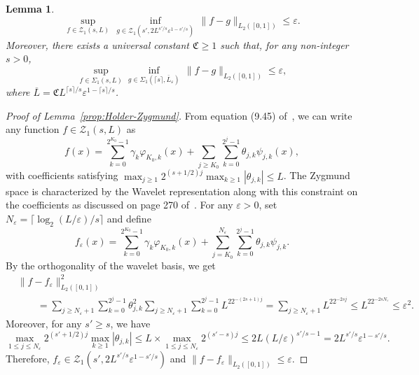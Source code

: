\documentclass[12pt]{article}
\newtheorem{lemma}[theorem]{Lemma}
\begin{document}
\begin{appendices}
\begin{lemma}
\[
\sup_{f\in\mathcal{Z}_1( s, L)}\,\inf_{g\in\mathcal{Z}_1( s', 2L^{ s'/ s}\varepsilon^{1- s'/ s})}\, \|f - g\|_{L_2([0, 1])} \le \varepsilon.
\]
Moreover, there exists a universal constant $\mathfrak{C} \ge 1$ such that, for any non-integer $ s > 0$,
\[
\sup_{f\in\Sigma_{1}( s, L)}\inf_{g\in\Sigma_1(\lceil s\rceil, \overline{L}_{\varepsilon})}\,\|f - g\|_{L_2([0, 1])} \le \varepsilon,
\]
where $\overline{L} = \mathfrak{C}L^{\lceil s\rceil/ s}\varepsilon^{1-\lceil s\rceil/ s}$.
\end{lemma}
\begin{proof}[Proof of Lemma~\ref{prop:Holder-Zygmund}]
From equation (9.45) of~\cite{johnstone2017gaussian}, we can write any function $f\in\mathcal{Z}_1( s, L)$ as
\[
f(x) = \sum_{k=0}^{2^{K_0} - 1} \gamma_k \varphi_{K_0, k}(x) + \sum_{j\ge K_0}\sum_{k=0}^{2^j - 1} \theta_{j,k} \psi_{j,k}(x),
\]
with coefficients satisfying $\max_{j\ge 1}2^{( s+1/2)j}\max_{k\ge1}|\theta_{j,k}| \le L$. The Zygmund space is characterized by the Wavelet representation along with this constraint on the coefficients as discussed on page 270 of~\cite{johnstone2017gaussian}. For any $\varepsilon > 0$, set $N_{\varepsilon} = \lceil\log_2(L/\varepsilon)/ s\rceil$ and define
\[
f_{\varepsilon}(x) = \sum_{k=0}^{2^{K_0} - 1} \gamma_k\varphi_{K_0, k}(x) + \sum_{j=K_0}^{N_{\varepsilon}}\sum_{k=0}^{2^{j} - 1} \theta_{j,k}\psi_{j,k}.
\]
By the orthogonality of the wavelet basis, we get
\begin{align*}
    &\|f - f_{\varepsilon}\|_{L_2([0, 1])}^2 \\
    &\qquad = \sum_{j \ge N_{\varepsilon} + 1}\sum_{k=0}^{2^{j} - 1} \theta_{j,k}^2  \sum_{j\ge N_{\varepsilon} + 1} \sum_{k=0}^{2^j - 1} L^22^{-(2 s + 1)j} = \sum_{j\ge N_{\varepsilon} + 1} L^22^{-2 s j} \le L^22^{-2 s N_{\varepsilon}} \le \varepsilon^2.
\end{align*}
Moreover, for any $ s' \ge  s$, we have
\[
\max_{1\le j\le N_{\varepsilon}}2^{( s' + 1/2)j}\max_{k\ge1} |\theta_{j,k}| \le L\times\max_{1\le j\le N_{\varepsilon}} 2^{( s' -  s)j} \le 2L(L/\varepsilon)^{ s'/ s - 1} = 2L^{ s'/ s}\varepsilon^{1 -  s'/ s}.
\]
Therefore, $f_{\varepsilon} \in \mathcal{Z}_1( s', 2L^{ s'/ s}\varepsilon^{1- s'/ s})$ and $\|f - f_{\varepsilon}\|_{L_2([0, 1])} \le \varepsilon.$


\end{proof}
\end{appendices}
\end{document}
